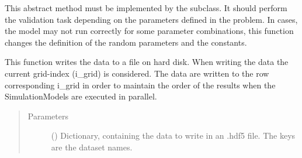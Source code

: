 \documentclass[letterpaper,10pt,english,openany,oneside]{sphinxmanual}
\begin{document}
\begin{fulllineitems}
\begin{fulllineitems}
\begin{quote}
\begin{description}
\end{description}\end{quote}

\end{fulllineitems}


\begin{fulllineitems}
\label{\detokenize{pygpc:pygpc.AbstractModel.AbstractModel.validate}}
This abstract method must be implemented by the subclass.
It should perform the validation task depending on the parameters defined in the problem.
In cases, the model may not run correctly for some parameter combinations, this function changes the definition
of the random parameters and the constants.

\end{fulllineitems}


\begin{fulllineitems}
\label{\detokenize{pygpc:pygpc.AbstractModel.AbstractModel.write_results}}
This function writes the data to a file on hard disk.
When writing the data the current grid-index (i\_grid) is considered.
The data are written to the row corresponding i\_grid in order to
maintain the order of the results when the SimulationModels are
executed in parallel.
\begin{quote}\begin{description}
\item[{Parameters}] \leavevmode
{} () \textendash{} Dictionary, containing the data to write in an .hdf5 file. The keys are the dataset names.

\end{description}\end{quote}

\end{fulllineitems}


\end{fulllineitems}
\end{document}
